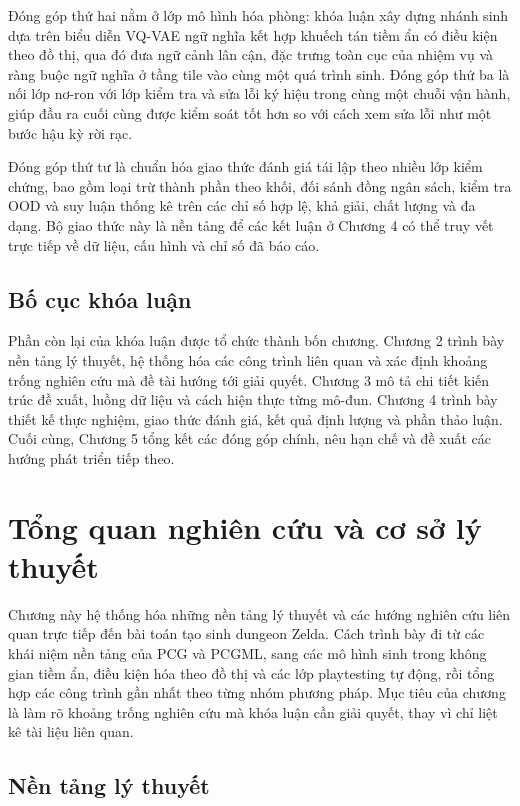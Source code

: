 \documentclass[oneside,a4paper,12pt]{extreport}
\begin{document}
Đóng góp thứ hai nằm ở lớp mô hình hóa phòng: khóa luận xây dựng nhánh sinh dựa trên biểu diễn VQ-VAE ngữ nghĩa kết hợp khuếch tán tiềm ẩn có điều kiện theo đồ thị, qua đó đưa ngữ cảnh lân cận, đặc trưng toàn cục của nhiệm vụ và ràng buộc ngữ nghĩa ở tầng tile vào cùng một quá trình sinh. Đóng góp thứ ba là nối lớp nơ-ron với lớp kiểm tra và sửa lỗi ký hiệu trong cùng một chuỗi vận hành, giúp đầu ra cuối cùng được kiểm soát tốt hơn so với cách xem sửa lỗi như một bước hậu kỳ rời rạc.

Đóng góp thứ tư là chuẩn hóa giao thức đánh giá tái lập theo nhiều lớp kiểm chứng, bao gồm loại trừ thành phần theo khối, đối sánh đồng ngân sách, kiểm tra OOD và suy luận thống kê trên các chỉ số hợp lệ, khả giải, chất lượng và đa dạng. Bộ giao thức này là nền tảng để các kết luận ở Chương 4 có thể truy vết trực tiếp về dữ liệu, cấu hình và chỉ số đã báo cáo.

\section{Bố cục khóa luận}
Phần còn lại của khóa luận được tổ chức thành bốn chương. Chương 2 trình bày nền tảng lý thuyết, hệ thống hóa các công trình liên quan và xác định khoảng trống nghiên cứu mà đề tài hướng tới giải quyết. Chương 3 mô tả chi tiết kiến trúc đề xuất, luồng dữ liệu và cách hiện thực từng mô-đun. Chương 4 trình bày thiết kế thực nghiệm, giao thức đánh giá, kết quả định lượng và phần thảo luận. Cuối cùng, Chương 5 tổng kết các đóng góp chính, nêu hạn chế và đề xuất các hướng phát triển tiếp theo.

\chapter{Tổng quan nghiên cứu và cơ sở lý thuyết}
Chương này hệ thống hóa những nền tảng lý thuyết và các hướng nghiên cứu liên quan trực tiếp đến bài toán tạo sinh dungeon Zelda. Cách trình bày đi từ các khái niệm nền tảng của PCG và PCGML, sang các mô hình sinh trong không gian tiềm ẩn, điều kiện hóa theo đồ thị và các lớp playtesting tự động, rồi tổng hợp các công trình gần nhất theo từng nhóm phương pháp. Mục tiêu của chương là làm rõ khoảng trống nghiên cứu mà khóa luận cần giải quyết, thay vì chỉ liệt kê tài liệu liên quan.

\section{Nền tảng lý thuyết}
\end{document}
